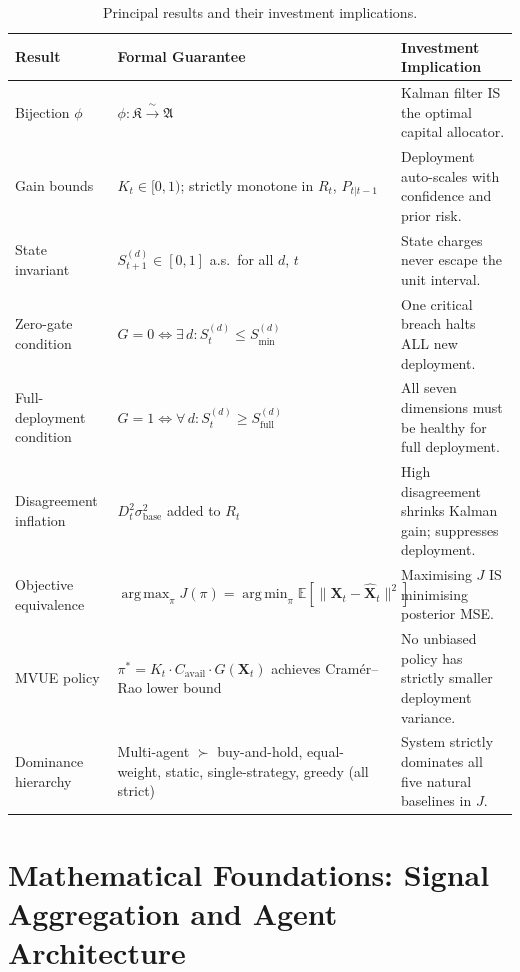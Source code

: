 \documentclass[12pt,openany]{book}
\newcommand{\E}{\mathbb{E}}
\DeclareMathOperator*{\argmax}{arg\,max}
\DeclareMathOperator*{\argmin}{arg\,min}
\numberwithin{equation}{chapter}
\theoremstyle{plain}
\theoremstyle{definition}
\theoremstyle{remark}
\def\mathcal#1{#1}%
\begin{document}
\begin{table}[H]
\centering
\caption{Principal results and their investment implications.}
\label{tab:exec-results}
\small
\begin{tabularx}{\linewidth}{@{} l X X @{}}
\toprule
\textbf{Result} & \textbf{Formal Guarantee}
  & \textbf{Investment Implication} \\
\midrule
Bijection $\phi$
  & $\phi : \mathfrak{K} \xrightarrow{\;\sim\;} \mathfrak{A}$
  & Kalman filter IS the optimal capital allocator. \\
Gain bounds
  & $K_t \in [0,1)$; strictly monotone in $R_t$, $P_{t|t-1}$
  & Deployment auto-scales with confidence and prior risk. \\
State invariant
  & $\mathcal{S}_{t+1}^{(d)} \in [0,1]$ a.s.\ for all $d$, $t$
  & State charges never escape the unit interval. \\
Zero-gate condition
  & $G = 0 \Leftrightarrow \exists\,d: \mathcal{S}_t^{(d)} \leq
    \mathcal{S}_{\min}^{(d)}$
  & One critical breach halts ALL new deployment. \\
Full-deployment condition
  & $G = 1 \Leftrightarrow \forall\,d: \mathcal{S}_t^{(d)} \geq
    \mathcal{S}_{\mathrm{full}}^{(d)}$
  & All seven dimensions must be healthy for full deployment. \\
Disagreement inflation
  & $D_t^2 \sigma_{\mathrm{base}}^2$ added to $R_t$
  & High disagreement shrinks Kalman gain; suppresses deployment. \\
Objective equivalence
  & $\argmax_\pi J(\pi) = \argmin_\pi \E[\|\mathbf{X}_t -
    \hat{\mathbf{X}}_t\|^2]$
  & Maximising $J$ IS minimising posterior MSE. \\
MVUE policy
  & $\pi^* = K_t \cdot C_{\mathrm{avail}} \cdot G(\mathbf{X}_t)$
    achieves Cram\'{e}r--Rao lower bound
  & No unbiased policy has strictly smaller deployment variance. \\
Dominance hierarchy
  & Multi-agent $\succ$ buy-and-hold, equal-weight, static,
    single-strategy, greedy (all strict)
  & System strictly dominates all five natural baselines in $J$. \\
\bottomrule
\end{tabularx}
\end{table}

\chapter{Mathematical Foundations: Signal Aggregation and
         Agent Architecture}
\label{ch:signals}
\end{document}
